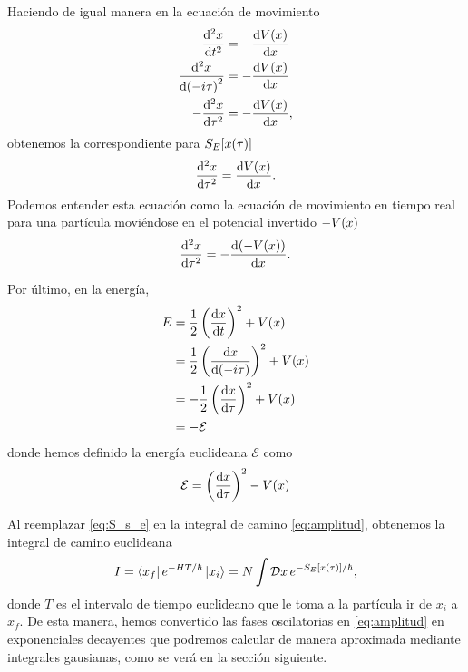Haciendo de igual manera en la ecuación de movimiento
\begin{align}
	\dv[2]{x}{t} &= -\dv{V(x)}{x} \\
	\dv[2]{x}{\qty(-i\tau)} &= -\dv{V(x)}{x} \\
	-\dv[2]{x}{\tau} &= -\dv{V(x)}{x},
\end{align}
obtenemos la correspondiente para  $S_E\qty[x\qty(\tau)]$
\begin{equation}\label{eq:mov_ec}
\dv[2]{x}{\tau} = \dv{V(x)}{x}.
\end{equation}
Podemos entender esta ecuación como la ecuación de movimiento en tiempo real para una partícula moviéndose en el potencial invertido $-V\qty(x)$
\begin{equation}
\dv[2]{x}{\tau} = -\dv{\qty(-V(x))}{x}.
\end{equation}
 
Por último, en la energía, 
\begin{align}
	E &= \frac{1}{2} \left(\dv{x}{t}\right)^2 + V\qty(x) \\
	&= \frac{1}{2} \left(\dv{x}{\qty(-i\tau)}\right)^2 + V\qty(x) \\
	&= -\frac{1}{2} \left(\dv{x}{\tau}\right)^2 + V\qty(x) \\
	&= -\mathcal{E}
\end{align}
donde hemos definido la energía euclideana $\mathcal{E}$ como \cite{rubakov2009classical}
\begin{equation}
	\mathcal{E} = \left(\dv{x}{\tau}\right)^2 - V\qty(x)
\end{equation}

Al reemplazar \eqref{eq:S_s_e} en la integral de camino \eqref{eq:amplitud}, obtenemos la integral de camino euclideana \cite{das2006field}
\begin{equation}\label{eq:amplitud_euc}
I = \bra{x_f}e^{-HT/\hbar}\ket{x_i} = N \int \mathcal{D}x \, e^{-S_E\qty[x\qty(\tau)]/\hbar},
\end{equation}
donde $T$ es el intervalo de tiempo euclideano que le toma a la partícula ir de $x_i$ a $x_f$. De esta manera, hemos convertido las fases oscilatorias en \eqref{eq:amplitud} en exponenciales decayentes que podremos calcular de manera aproximada mediante integrales gausianas, como se verá en la sección siguiente.


